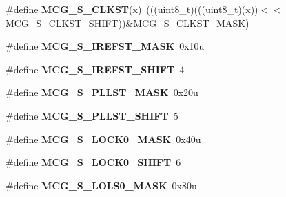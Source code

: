 \begin{DoxyCompactItemize}
\item 
\#define {\bfseries M\+C\+G\+\_\+\+S\+\_\+\+C\+L\+K\+ST}(x)~(((uint8\+\_\+t)(((uint8\+\_\+t)(x))$<$$<$M\+C\+G\+\_\+\+S\+\_\+\+C\+L\+K\+S\+T\+\_\+\+S\+H\+I\+FT))\&M\+C\+G\+\_\+\+S\+\_\+\+C\+L\+K\+S\+T\+\_\+\+M\+A\+SK)\hypertarget{group__MCG__Register__Masks_ga891e8f2d733bebc7ab21cf49e0473b24}{}\label{group__MCG__Register__Masks_ga891e8f2d733bebc7ab21cf49e0473b24}

\item 
\#define {\bfseries M\+C\+G\+\_\+\+S\+\_\+\+I\+R\+E\+F\+S\+T\+\_\+\+M\+A\+SK}~0x10u\hypertarget{group__MCG__Register__Masks_ga5bf822a90d9c1e67d5297420157e1dd0}{}\label{group__MCG__Register__Masks_ga5bf822a90d9c1e67d5297420157e1dd0}

\item 
\#define {\bfseries M\+C\+G\+\_\+\+S\+\_\+\+I\+R\+E\+F\+S\+T\+\_\+\+S\+H\+I\+FT}~4\hypertarget{group__MCG__Register__Masks_ga4a2727883c339845e709dacc0c2fd71a}{}\label{group__MCG__Register__Masks_ga4a2727883c339845e709dacc0c2fd71a}

\item 
\#define {\bfseries M\+C\+G\+\_\+\+S\+\_\+\+P\+L\+L\+S\+T\+\_\+\+M\+A\+SK}~0x20u\hypertarget{group__MCG__Register__Masks_ga6f176d95968a5b7b1af67ae81734c854}{}\label{group__MCG__Register__Masks_ga6f176d95968a5b7b1af67ae81734c854}

\item 
\#define {\bfseries M\+C\+G\+\_\+\+S\+\_\+\+P\+L\+L\+S\+T\+\_\+\+S\+H\+I\+FT}~5\hypertarget{group__MCG__Register__Masks_gafddddab311f8f0cb58e7b7941f6d9a8d}{}\label{group__MCG__Register__Masks_gafddddab311f8f0cb58e7b7941f6d9a8d}

\item 
\#define {\bfseries M\+C\+G\+\_\+\+S\+\_\+\+L\+O\+C\+K0\+\_\+\+M\+A\+SK}~0x40u\hypertarget{group__MCG__Register__Masks_ga6cb486757d45c5211baa3b130e720b97}{}\label{group__MCG__Register__Masks_ga6cb486757d45c5211baa3b130e720b97}

\item 
\#define {\bfseries M\+C\+G\+\_\+\+S\+\_\+\+L\+O\+C\+K0\+\_\+\+S\+H\+I\+FT}~6\hypertarget{group__MCG__Register__Masks_ga5022e367019ecb07d0afbc3279e60b02}{}\label{group__MCG__Register__Masks_ga5022e367019ecb07d0afbc3279e60b02}

\item 
\#define {\bfseries M\+C\+G\+\_\+\+S\+\_\+\+L\+O\+L\+S0\+\_\+\+M\+A\+SK}~0x80u\hypertarget{group__MCG__Register__Masks_gae5967720d747b4d6f9fa748c94570c6d}{}\label{group__MCG__Register__Masks_gae5967720d747b4d6f9fa748c94570c6d}


\end{DoxyCompactItemize}
